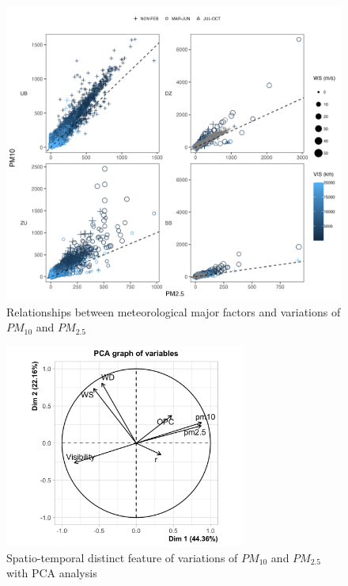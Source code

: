 \documentclass[
  11pt,
]{article}
\begin{document}
\begin{figure}
\centering
\includegraphics[width=5.20833in,height=\textheight,keepaspectratio]{images/figure_6.png}
\caption{Relationships between meteorological major factors and
variations of \(PM_{10}\) and \(PM_{2.5}\)}
\end{figure}

\newpage

\begin{figure}
\centering
\includegraphics[width=3.125in,height=\textheight,keepaspectratio]{images/figure_7.png}
\caption{Spatio-temporal distinct feature of variations of \(PM_{10}\)
and \(PM_{2.5}\) with PCA analysis}
\end{figure}
\end{document}
